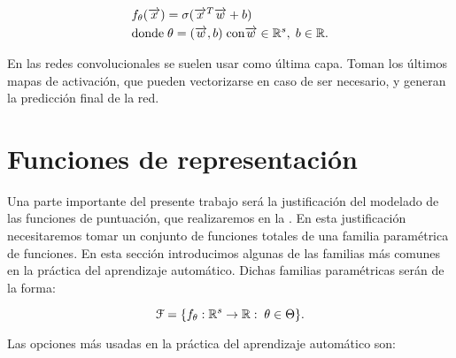 \begin{equation}
\begin{split}
    & f_\theta(\overrightarrow{x}) = \sigma(\overrightarrow{x}^T \overrightarrow{w} + b) \\
    & \text{donde} \; \theta = (\overrightarrow{w}, b) \; \text{con} \overrightarrow{w} \in \mathbb{R}^s, \; b \in \mathbb{R}.
\end{split}
\end{equation}

En las redes convolucionales se suelen usar como última capa. Toman los últimos mapas de activación, que pueden vectorizarse en caso de ser necesario, y generan la predicción final de la red.

\section{Funciones de representación} \label{sec:funciones_representacion}

Una parte importante del presente trabajo será la justificación del modelado de las funciones de puntuación, que realizaremos en la . En esta justificación necesitaremos tomar un conjunto de funciones totales de una familia paramétrica de funciones. En esta sección introducimos algunas de las familias más comunes en la práctica del aprendizaje automático. Dichas familias paramétricas serán de la forma:

\begin{equation}
	\mathcal{F} = \{  f_{\theta}: \mathbb{R}^s \to \mathbb{R}: \; \theta \in \Theta \}.
\end{equation}

Las opciones más usadas en la práctica del aprendizaje automático son:

